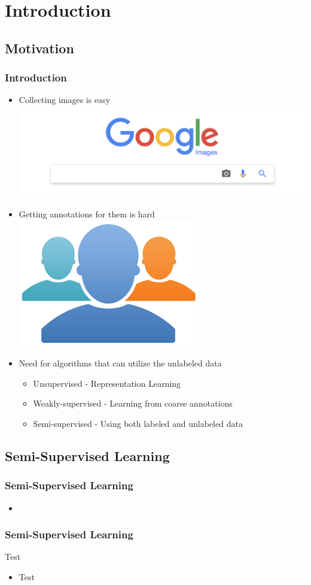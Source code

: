 \section{Introduction}

\subsection{Motivation}
\begin{frame}
	\frametitle{Introduction}
	\begin{itemize}
		\item Collecting images is easy\\
			\includegraphics[scale=0.2]{images/google}
		\item Getting annotations for them is hard\\
			\includegraphics[scale=0.2]{images/amt}
		\item Need for algorithms that can utilize the unlabeled data
			\begin{itemize}
				\item Unsupervised - Representation Learning
				\item Weakly-supervised - Learning from coarse annotations
				\item Semi-supervised - Using both labeled and unlabeled data
			\end{itemize}
	\end{itemize}
\end{frame}

\subsection{Semi-Supervised Learning}
\begin{frame}
	\frametitle{Semi-Supervised Learning}
	\begin{itemize}
		\item 
	\end{itemize}
\end{frame}

\begin{frame}
	\frametitle{Semi-Supervised Learning}
	Test
	\begin{itemize}
		\item Test
	\end{itemize}
\end{frame}
